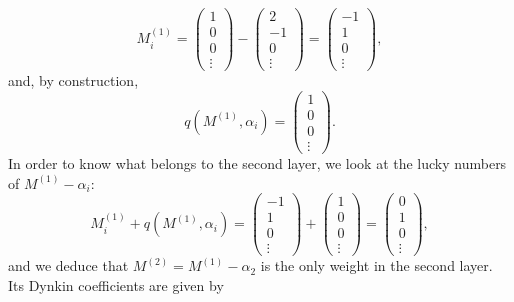\begin{equation}
	M^{(1)}_i=
	\begin{pmatrix}
		1\\0\\0\\\vdots
	\end{pmatrix}-
	\begin{pmatrix}
		2\\-1\\0\\\vdots
	\end{pmatrix}=
	\begin{pmatrix}
		-1\\1\\0\\\vdots
	\end{pmatrix},
\end{equation}
and, by construction,
\begin{equation}
	q(M^{(1)},\alpha_i)=
	\begin{pmatrix}
		1\\0\\0\\\vdots
	\end{pmatrix}.
\end{equation}
In order to know what belongs to the second layer, we look at the lucky numbers of $M^{(1)}-\alpha_i$:
\begin{equation}
	M^{(1)}_i+q(M^{(1)},\alpha_i)=
	\begin{pmatrix}
		-1\\1\\0\\\vdots
	\end{pmatrix}+
	\begin{pmatrix}
		1\\0\\0\\\vdots
	\end{pmatrix}=
	\begin{pmatrix}
		0\\1\\0\\\vdots
	\end{pmatrix},
\end{equation}
and we deduce that $M^{(2)}=M^{(1)}-\alpha_2$ is the only weight in the second layer. Its Dynkin coefficients are given by
